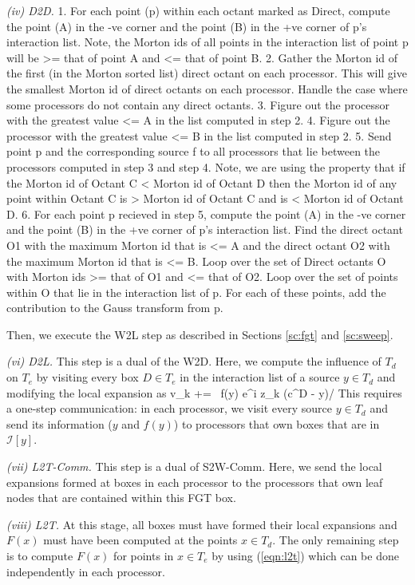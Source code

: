 {\em (iv) D2D.}
1. For each point (p) within each octant marked as Direct, compute the
point (A) in the -ve corner and the point (B) in the +ve corner of p's
interaction list. Note, the Morton ids of all points in the interaction
list of point p will be >= that of point A and <= that of point B.
2. Gather the Morton id of the first (in the Morton sorted list) direct
octant on each processor. This will give the smallest Morton id of
direct octants on each processor. Handle the case where some processors
do not contain any direct octants.
3. Figure out the processor with the greatest value <= A in the list
computed in step 2.
4. Figure out the processor with the greatest value <= B in the list
computed in step 2.
5. Send point p and the corresponding source f to all processors that
lie between the processors computed in step 3 and step 4. Note, we are 
using the property that if the Morton id of Octant C < Morton id of 
Octant D then the Morton id of any point within Octant C is >  Morton
id of Octant C and is < Morton id of Octant D.
6. For each point p recieved in step 5, compute the
point (A) in the -ve corner and the point (B) in the +ve corner of p's
interaction list. Find the direct octant O1 with the maximum Morton id that
is <= A and the direct octant O2 with the maximum Morton id that is <=
B. Loop over the set of Direct octants O with Morton ids >= that of O1
and <= that of O2. Loop over the set of points within O that lie in the
interaction list of p. For each of these points, add the contribution to
the Gauss transform from p.


Then, we execute the W2L step as described in Sections \ref{sc:fgt} and \ref{sc:sweep}. 


{\em (vi) D2L.} This step is a dual of the W2D. Here, we compute the influence of $T_d$ on $T_e$ by visiting every box $D \in T_e$ in the interaction list of a source $y \in T_d$ and modifying the local expansion as 
%
\beq v_k += \, f(y) e^{i z_k \cdot (c^D - y)/\sqrt{\delta}} \eeq
%
This requires a one-step communication: in each processor, we visit every source $y \in T_d$ 
and send its information ($y$ and $f(y)$) to processors that own boxes that are in $\mathcal{I}[y]$.

{\em (vii) L2T-Comm.} This step is a dual of S2W-Comm. Here, we send the local expansions formed at boxes in each processor 
to the processors that own leaf nodes that are contained within this FGT box. 

{\em (viii) L2T.} At this stage, all boxes must have formed their local expansions and $F(x)$ must have been computed at
 the points $x \in T_d$. The only remaining step is to compute $F(x)$ for points in $x \in T_e$ by using (\ref{eqn:l2t}) 
 which can be done independently in each processor. 

